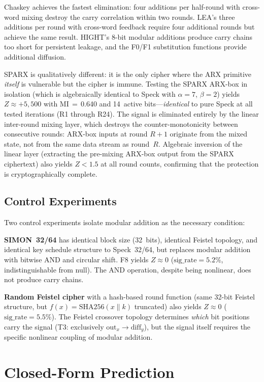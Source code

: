 \documentclass[conference,a4paper]{IEEEtran}
\begin{document}
Chaskey achieves the fastest elimination: four additions per half-round with cross-word mixing destroy the carry correlation within two rounds. LEA's three additions per round with cross-word feedback require four additional rounds but achieve the same result. HIGHT's 8-bit modular additions produce carry chains too short for persistent leakage, and the F0/F1 substitution functions provide additional diffusion.

SPARX is qualitatively different: it is the only cipher where the ARX primitive \emph{itself} is vulnerable but the cipher is immune. Testing the SPARX ARX-box in isolation (which is algebraically identical to Speck with $\alpha{=}7$, $\beta{=}2$) yields $Z \approx +5{,}500$ with MI\,$=$\,0.640 and 14~active bits---\emph{identical} to pure Speck at all tested iterations (R1 through R24). The signal is eliminated entirely by the linear inter-round mixing layer, which destroys the counter-monotonicity between consecutive rounds: ARX-box inputs at round $R{+}1$ originate from the mixed state, not from the same data stream as round~$R$. Algebraic inversion of the linear layer (extracting the pre-mixing ARX-box output from the SPARX ciphertext) also yields $Z < 1.5$ at all round counts, confirming that the protection is cryptographically complete.

\subsection{Control Experiments}

Two control experiments isolate modular addition as the necessary condition:

\textbf{SIMON~32/64} has identical block size (32~bits), identical Feistel topology, and identical key schedule structure to Speck~32/64, but replaces modular addition with bitwise AND and circular shift. F8 yields $Z \approx 0$ ($\text{sig\_rate} = 5.2\%$, indistinguishable from null). The AND operation, despite being nonlinear, does not produce carry chains.

\textbf{Random Feistel cipher} with a hash-based round function (same 32-bit Feistel structure, but $f(x) = \mathrm{SHA256}(x \| k)$ truncated) also yields $Z \approx 0$ ($\text{sig\_rate} = 5.5\%$). The Feistel crossover topology determines \emph{which} bit positions carry the signal (T3: exclusively $\mathrm{out}_x \to \mathrm{diff}_y$), but the signal itself requires the specific nonlinear coupling of modular addition.

\section{Closed-Form Prediction}
\end{document}
